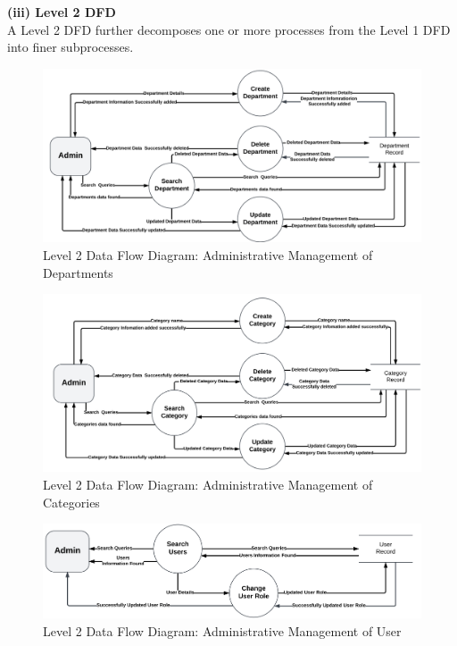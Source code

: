 \documentclass[a4paper,12pt]{article}
\begin{document}
\noindent \textbf{(iii) Level 2 DFD} \\
A Level 2 DFD further decomposes one or more processes from the Level 1 DFD into finer subprocesses.
\begin{figure}[H]
    \centering
    \includegraphics[width=1\linewidth]{photos/dfd-2-department.png}
    \caption{Level 2 Data Flow Diagram: Administrative Management of Departments}
    \label{fig:enter-label}
\end{figure}
\begin{figure}[H]
    \centering
    \includegraphics[width=1\linewidth]{photos/dfd-2-category.png}
    \caption{Level 2 Data Flow Diagram: Administrative Management of Categories}
    \label{fig:enter-label}
\end{figure}
\begin{figure}[H]
    \centering
    \includegraphics[width=1\linewidth]{photos/dfd-2-user.png}
    \caption{Level 2 Data Flow Diagram: Administrative Management of User}
    \label{fig:enter-label}
\end{figure}
\end{document}
